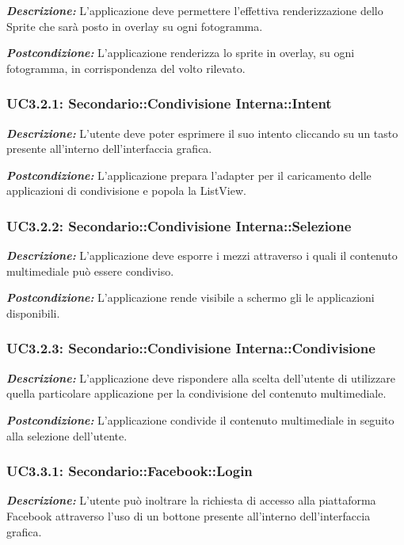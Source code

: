 \textbf{\textit{Descrizione:}} L'applicazione deve permettere l'effettiva renderizzazione dello Sprite che sarà posto in overlay su ogni fotogramma.

\textbf{\textit{Postcondizione:}} L'applicazione renderizza lo sprite in overlay, su ogni fotogramma, in corrispondenza del volto rilevato.

\subsubsection{UC3.2.1: Secondario::Condivisione Interna::Intent }

\textbf{\textit{Descrizione:}} L'utente deve poter esprimere il suo intento cliccando su un tasto presente all'interno dell'interfaccia grafica.

\textbf{\textit{Postcondizione:}} L'applicazione prepara l'adapter per il caricamento delle applicazioni di condivisione e popola la ListView.

\subsubsection{UC3.2.2: Secondario::Condivisione Interna::Selezione}

\textbf{\textit{Descrizione:}} L'applicazione deve esporre i mezzi attraverso i quali il contenuto multimediale può essere condiviso.

\textbf{\textit{Postcondizione:}} L'applicazione rende visibile a schermo gli le applicazioni disponibili.

\subsubsection{UC3.2.3: Secondario::Condivisione Interna::Condivisione}

\textbf{\textit{Descrizione:}} L'applicazione deve rispondere alla scelta dell'utente di utilizzare quella particolare applicazione per la condivisione del contenuto multimediale.

\textbf{\textit{Postcondizione:}} L'applicazione condivide il contenuto multimediale in seguito alla selezione dell'utente.

\subsubsection{UC3.3.1: Secondario::Facebook::Login}

\textbf{\textit{Descrizione:}} L'utente può inoltrare la richiesta di accesso alla piattaforma Facebook attraverso l'uso di un bottone presente all'interno dell'interfaccia grafica.


